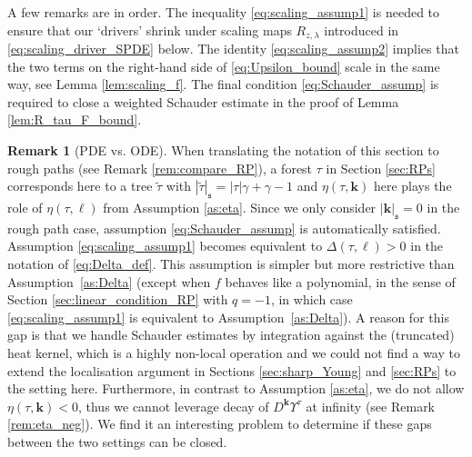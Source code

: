 \documentclass[11pt,a4paper]{article}
\numberwithin{equation}{section}
\theoremstyle{definition}
\newtheorem{remark}[theorem]{Remark}
\theoremstyle{remark}
\newcommand{\bk}{\mathbf{k}}
\newcommand{\s}{\mathfrak{s}}
\begin{document}
A few remarks are in order.
The inequality \eqref{eq:scaling_assump1} is needed to ensure that our `drivers' shrink under scaling maps $R_{z,\lambda}$ introduced in \eqref{eq:scaling_driver_SPDE} below.
The identity \eqref{eq:scaling_assump2} implies that the two terms on the right-hand side of \eqref{eq:Upsilon_bound} scale in the same way, see Lemma \ref{lem:scaling_f}.
The final condition \eqref{eq:Schauder_assump} is required to close a weighted Schauder estimate in the proof of Lemma \ref{lem:R_tau_F_bound}.


\begin{remark}[PDE vs. ODE]\label{rem:RP_assump}
When translating the notation of this section to rough paths (see Remark \ref{rem:compare_RP}), a forest $\tau$ in Section \ref{sec:RPs} corresponds here to a tree $\tilde\tau$ with $|\tilde\tau|_\s = |\tau|\gamma + \gamma - 1$
and $\eta(\tau,\bk)$ here plays the role of $\eta(\tau,\ell)$ from Assumption \ref{as:eta}.
Since we only consider $|\bk|_\s=0$ in the rough path case, assumption \eqref{eq:Schauder_assump} is automatically satisfied.
Assumption \eqref{eq:scaling_assump1} becomes equivalent to $\Delta(\tau,\ell)>0$ in the notation of \eqref{eq:Delta_def}.
This assumption is simpler but more restrictive than Assumption~\ref{as:Delta} (except when $f$ behaves like a polynomial, in the sense of Section \ref{sec:linear_condition_RP} with $q=-1$, in which case \eqref{eq:scaling_assump1} is equivalent to Assumption~\ref{as:Delta}).
A reason for this gap is that we handle Schauder estimates by integration against the (truncated) heat kernel, which is a highly non-local operation and we could not find a way to extend the localisation argument in Sections \ref{sec:sharp_Young} and \ref{sec:RPs} to the setting here.
Furthermore, in contrast to Assumption \ref{as:eta}, we do not allow $\eta(\tau,\bk) < 0$,
thus we cannot leverage decay of $D^\bk\Upsilon^\tau$ at infinity (see Remark \ref{rem:eta_neg}).
We find it an interesting problem to determine if these gaps between the two settings can be closed.
\end{remark}

\end{document}
